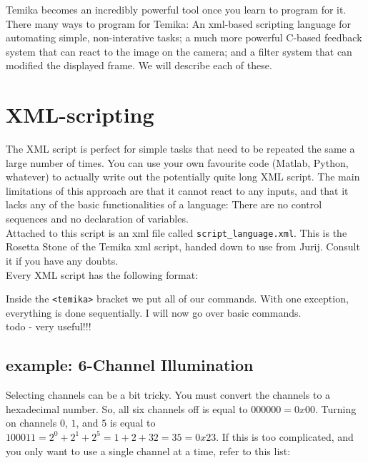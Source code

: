 \documentclass{report}
\begin{document}
Temika becomes an incredibly powerful tool once you learn to program for it. There many  ways to program for Temika: An xml-based scripting language for automating simple, non-interative tasks; a much more powerful C-based feedback system that can react to the image on the camera; and a filter system that can modified the displayed frame. We will describe each of these.

\section{XML-scripting}

The XML script is perfect for simple tasks that need to be repeated the same a large number of times.  You can use your own favourite code (Matlab, Python, whatever) to actually write out the potentially quite long XML script.    The  main limitations of this approach are that it cannot react to any inputs, and that it lacks any of the basic functionalities of a language: There are no control sequences and no declaration of variables.\\

Attached to this script is an xml file called \verb|script_language.xml|. This is the Rosetta Stone of the Temika xml script, handed down to use from Jurij. Consult it if you have any doubts.\\

Every XML script has the following format:



Inside the \verb|<temika>| bracket we put all of our commands. With one exception, everything is done sequentially. I will now go over basic commands.\\

todo - very useful!!!





\newpage

\subsection{example: 6-Channel Illumination}



Selecting channels can be a bit tricky. You must convert the channels to a hexadecimal number. So, all six channels off is equal to $000000 = 0x00$. Turning on channels $0$, $1$, and $5$ is equal to $100011 = 2^0 + 2^1 + 2^5 = 1 + 2 + 32 = 35 = 0x23$. If this is too complicated, and you only want to use a single channel at a time, refer to this list:
\end{document}
